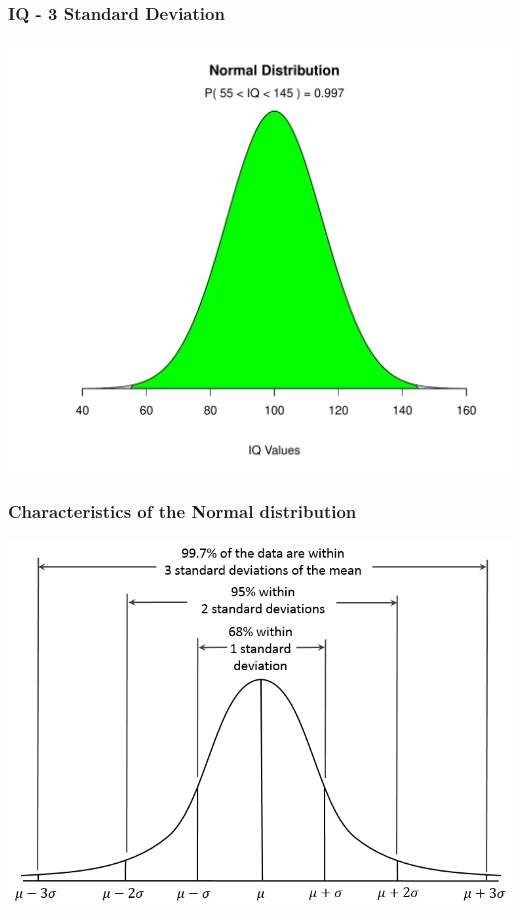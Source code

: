 \documentclass[dvipsnames]{beamer}\usepackage[]{graphicx}\usepackage[]{color}
\makeatletter
\def\maxwidth{ %
  \ifdim\Gin@nat@width>\linewidth
    \linewidth
  \else
    \Gin@nat@width
  \fi
}
\newenvironment{knitrout}{}{} %
\makeatother
\begin{document}
\begin{frame}
\frametitle{IQ - 3 Standard Deviation}
\begin{knitrout}
\color{fgcolor}

{\centering \includegraphics[width=\maxwidth]{figure/unnamed-chunk-12-1} 

}



\end{knitrout}
\end{frame}

\begin{frame}
\frametitle{Characteristics of the Normal distribution}
\begin{center}
\includegraphics[scale = .5]{images/normal.png}
\end{center}
\end{frame}
\end{document}
